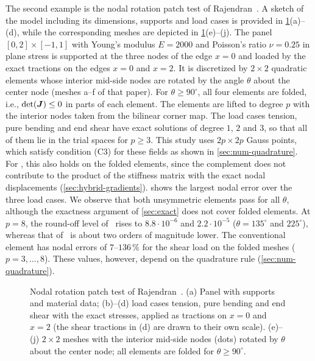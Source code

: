 The second example is the nodal rotation patch test of Rajendran~\cite[Sects.~5.5--5.7]{Rajendran2010technique}. A sketch of the model including its dimensions, supports and load cases is provided in \cref{fig:panel}(a)--(d), while the corresponding meshes are depicted in \cref{fig:panel}(e)--(j). The panel $[0,2]\times[-1,1]$ with Young's modulus $E=2000$ and Poisson's ratio $\nu=0.25$ in plane stress is supported at the three nodes of the edge $x=0$ and loaded by the exact tractions on the edges $x=0$ and $x=2$. It is discretized by $2\times2$ quadratic elements whose interior mid-side nodes are rotated by the angle $\theta$ about the center node (meshes a--f of that paper). For $\theta\ge90^\circ$, all four elements are folded, i.e., $\det(\bm{J})\le0$ in parts of each element. The elements are lifted to degree $p$ with the interior nodes taken from the bilinear corner map. The load cases tension, pure bending and end shear have exact solutions of degree $1$, $2$ and $3$, so that all of them lie in the trial spaces for $p\ge3$. This study uses $2p\times2p$ Gauss points, which satisfy condition (C3) for these fields as shown in \cref{sec:num-quadrature}. For \PH, this also holds on the folded elements, since the complement does not contribute to the product of the stiffness matrix with the exact nodal displacements (\cref{sec:hybrid-gradients}).  shows the largest nodal error over the three load cases. We observe that both unsymmetric elements pass for all $\theta$, although the exactness argument of \cref{sec:exact} does not cover folded elements. At $p=8$, the round-off level of \PM\ rises to $8.8\cdot10^{-6}$ and $2.2\cdot10^{-5}$ ($\theta=135^\circ$ and $225^\circ$), whereas that of \PH\ is about two orders of magnitude lower. The conventional element has nodal errors of $7$--$136\,\%$ for the shear load on the folded meshes ($p=3,\dots,8$). These values, however, depend on the quadrature rule (\cref{sec:num-quadrature}).

\begin{figure}[htbp]
  \centering
  
  \caption{Nodal rotation patch test of Rajendran~\cite{Rajendran2010technique}. (a) Panel with supports and material data; (b)--(d) load cases tension, pure bending and end shear with the exact stresses, applied as tractions on $x=0$ and $x=2$ (the shear tractions in (d) are drawn to their own scale). (e)--(j) $2\times2$ meshes with the interior mid-side nodes (dots) rotated by $\theta$ about the center node; all elements are folded for $\theta\ge90^\circ$.}
  \label{fig:panel}
\end{figure}

